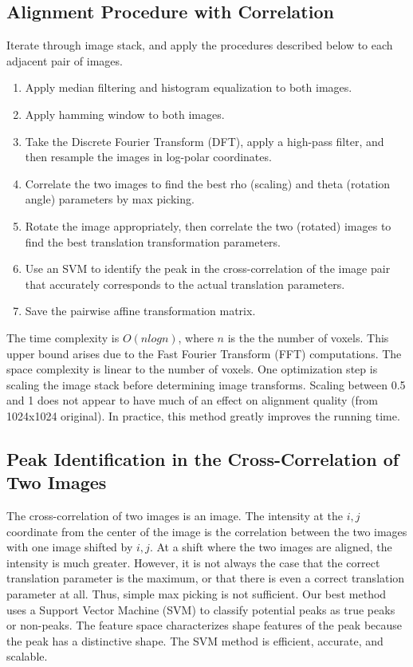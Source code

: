 \documentclass{article}
\begin{document}
\subsection{Alignment Procedure with Correlation}
Iterate through image stack, and apply the procedures described below to each adjacent pair of images.
\begin{enumerate}
\item Apply median filtering and histogram equalization to both images.
\item Apply hamming window to both images. 
\item Take the Discrete Fourier Transform (DFT), apply a high-pass filter, and then resample the images in log-polar coordinates. 
\item Correlate the two images to find the best rho (scaling) and theta (rotation angle) parameters by max picking.
\item Rotate the image appropriately, then correlate the two (rotated) images to find the best translation transformation parameters.
\item Use an SVM to identify the peak in the cross-correlation of the image pair that accurately corresponds to the actual translation parameters.
\item Save the pairwise affine transformation matrix. 
\end{enumerate}The time complexity is $O(nlogn)$, where $n$ is the the number of voxels. This upper bound arises due to the Fast Fourier Transform (FFT) computations. The space complexity is linear to the number of voxels. One optimization step is scaling the image stack before determining image transforms. Scaling between 0.5 and 1 does not appear to have much of an effect on alignment quality (from 1024x1024 original). In practice, this method greatly improves the running time. \\

\subsection{Peak Identification in the Cross-Correlation of Two Images}
The cross-correlation of two images is an image. The intensity at the $i,j$ coordinate from the center of the image is the correlation between the two images with one image shifted by $i,j$. At a shift where the two images are aligned, the intensity is much greater. However, it is not always the case that the correct translation parameter is the maximum, or that there is even a correct translation parameter at all. Thus, simple max picking is not sufficient. Our best method uses a Support Vector Machine (SVM) to classify potential peaks as true peaks or non-peaks. The feature space characterizes shape features of the peak because the peak has a distinctive shape. The SVM method is efficient, accurate, and scalable. 
\end{document}
